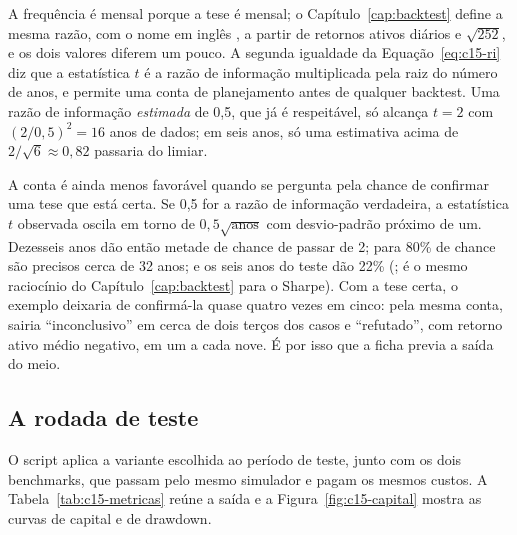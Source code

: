 A frequência é mensal porque a tese é mensal; o Capítulo~\ref{cap:backtest} define a mesma razão, com o nome em inglês , a partir de retornos ativos diários e $\sqrt{252}$, e os dois valores diferem um pouco. A segunda igualdade da Equação~\eqref{eq:c15-ri} diz que a estatística $t$ é a razão de informação multiplicada pela raiz do número de anos, e permite uma conta de planejamento antes de qualquer backtest. Uma razão de informação \emph{estimada} de 0,5, que já é respeitável, só alcança $t = 2$ com $(2/0,5)^2 = 16$ anos de dados; em seis anos, só uma estimativa acima de $2/\sqrt{6} \approx 0,82$ passaria do limiar.

A conta é ainda menos favorável quando se pergunta pela chance de confirmar uma tese que está certa. Se 0,5 for a razão de informação verdadeira, a estatística $t$ observada oscila em torno de $0,5\sqrt{\text{anos}}$ com desvio-padrão próximo de um. Dezesseis anos dão então metade de chance de passar de 2; para 80\% de chance são precisos cerca de 32 anos; e os seis anos do teste dão 22\% (; é o mesmo raciocínio do Capítulo~\ref{cap:backtest} para o Sharpe). Com a tese certa, o exemplo deixaria de confirmá-la quase quatro vezes em cinco: pela mesma conta, sairia ``inconclusivo'' em cerca de dois terços dos casos e ``refutado'', com retorno ativo médio negativo, em um a cada nove. É por isso que a ficha previa a saída do meio.

\subsection{A rodada de teste}

O script  aplica a variante escolhida ao período de teste, junto com os dois benchmarks, que passam pelo mesmo simulador e pagam os mesmos custos. A Tabela~\ref{tab:c15-metricas} reúne a saída e a Figura~\ref{fig:c15-capital} mostra as curvas de capital e de drawdown.

